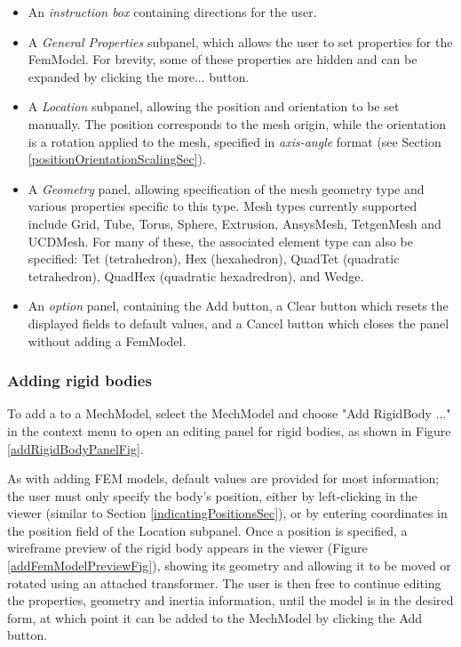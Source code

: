 \documentclass{article}
\begin{document}
\begin{itemize}

\item An {\it instruction box} containing directions for the user.

\item A {\it General Properties} subpanel, which allows the user to set properties
for the FemModel. For brevity, some of these properties are hidden and can
be expanded by clicking the {\sf more...} button.

\item A {\it Location} subpanel, allowing the position and orientation to be
set manually. The position corresponds to the mesh origin, while the
orientation is a rotation applied to the mesh, specified in
{\it axis-angle} format (see Section \ref{positionOrientationScalingSec}).

\item A {\it Geometry} panel, allowing specification of the mesh geometry type
and various properties specific to this type.  Mesh types currently
supported include Grid, Tube, Torus, Sphere, Extrusion, AnsysMesh,
TetgenMesh and UCDMesh.  For many of these, the associated element
type can also be specified: Tet (tetrahedron), Hex (hexahedron),
QuadTet (quadratic tetrahedron), QuadHex (quadratic hexadredron), and
Wedge.

\item An {\it option} panel, containing the {\sf Add} button, a {\sf Clear} button
which resets the displayed fields to default values, and a {\sf Cancel}
button which closes the panel without adding a FemModel.

\end{itemize}

\subsubsection{Adding rigid bodies}

To add a  to a MechModel,
select the MechModel and choose {\sf "Add RigidBody ..."} in the context menu to
open an editing panel for rigid bodies, as shown in 
Figure \ref{addRigidBodyPanelFig}.

As with adding FEM models, default values are provided for most
information; the user must only specify the body's position, either by
left-clicking in the viewer (similar to Section \ref{indicatingPositionsSec}), 
or by entering
coordinates in the {\sf position} field of the {\sf Location} subpanel.  Once
a position is specified, a wireframe preview of the rigid body appears
in the viewer (Figure \ref{addFemModelPreviewFig}), showing its geometry and
allowing it to be moved or rotated using an attached transformer. The
user is then free to continue editing the properties, geometry and
inertia information, until the model is in the desired form, at which
point it can be added to the MechModel by clicking the {\sf Add} button.
\end{document}
